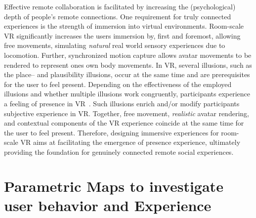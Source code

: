 
Effective remote collaboration is facilitated by increasing the (psychological) depth of people's remote connections. One requirement for truly connected experiences is the strength of immersion into virtual environments. Room-scale VR significantly increases the users immersion by, first and foremost, allowing free movements, simulating \textit{natural} real world sensory experiences due to locomotion. Further, synchronized motion capture allows avatar movements to be rendered to represent ones own body movements. In VR, several illusions, such as the place-- and plausibility illusions,  occur at the same time and are prerequisites for the user to feel present. Depending on the effectiveness of the employed illusions and whether multiple illusions work congruently, participants experience a feeling of presence in VR~\cite{Gonzalez-Franco2017, Kilteni2012}. Such illusions enrich and/or modify participants subjective experience in VR. Together, free movement, \textit{realistic} avatar rendering, and contextual components of the VR experience coincide at the same time for the user to feel present. Therefore, designing immersive experiences for room-scale VR aims at facilitating the emergence of presence experience, ultimately providing the foundation for genuinely connected remote social experiences.


\section{Parametric Maps to investigate user behavior and Experience}

